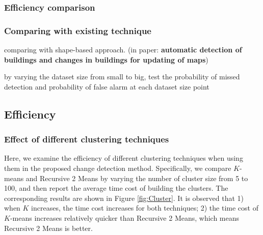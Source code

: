 \documentclass[runningheads,a4paper]{llncs}
\newcommand{\eat}[1]{}
\begin{document}
\subsubsection{Efficiency comparison}


\subsubsection{Comparing with existing technique}

comparing with shape-based approach. (in paper: \textbf{automatic detection of buildings and changes in buildings for updating of maps})

by varying the dataset size from small to big, test the probability of missed detection and probability of false alarm at each dataset size point

\eat{
\subsubsection{Effect of number tags : Effect of T}
\subsubsection{Effect of Cluster : Effect of K}
\subsubsection{comparison of EoT and EoK}
}

\subsection{Efficiency}

\subsubsection{Effect of different clustering techniques}

Here, we examine the efficiency of different clustering techniques when using them in the proposed change detection method. 
Specifically, 
we compare $K$-means and Recursive 2 Means 
by varying the number of cluster size from 5 to 100,
and then report the average time cost of building the clusters. 
The corresponding results are shown in Figure \ref{fig:Cluster}. 
It is observed that
1) when $K$ increases, the time cost increases for both techniques;
2) the time cost of $K$-means increases relatively quicker than Recursive 2 Means,
which means Recursive 2 Means is better.
%
\end{document}
